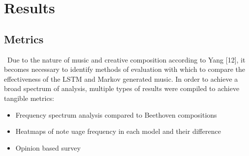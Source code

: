 \documentclass[12pt]{article}
\begin{document}
\section*{Results}
\subsection*{Metrics}
\begin{flushright}
  \begin{minipage}[t]{0.96\linewidth}\
    Due to the nature of music and creative composition according to Yang [12], it becomes necessary to identify methods of evaluation with which to compare the effectiveness of the LSTM and Markov generated music. In order to achieve a broad spectrum of analysis, multiple types of results were compiled to achieve tangible metrics:
    \begin{itemize}
        \item Frequency spectrum analysis compared to Beethoven compositions
        \item Heatmaps of note uage frequency in each model and their difference
        \item Opinion based survey
    \end{itemize}
  \end{minipage}
\end{flushright}
\end{document}

